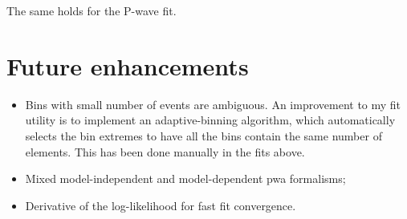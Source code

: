     The same holds for the P-wave \Prhozero{} fit.


    \section{Future enhancements}
    

    \begin{itemize}
        \item 
            Bins with small number of events are ambiguous. 
            An improvement to my fit utility is to implement an adaptive-binning algorithm, which automatically selects the bin extremes to have all the bins contain the same number of elements.
            This has been done manually in the fits above.

        \item Mixed model-independent and model-dependent \ac{pwa} formalisms;

        \item Derivative of the log-likelihood for fast fit convergence.
    \end{itemize}


